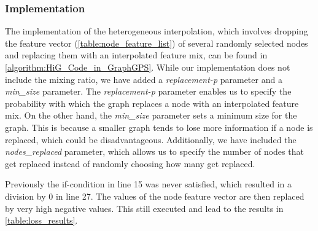 \subsubsection{Implementation}
The implementation of the heterogeneous interpolation, which involves dropping the feature vector (\autoref{table:node_feature_list}) of several randomly selected nodes and replacing them with an interpolated feature mix, can be found in \autoref{algorithm:HiG_Code_in_GraphGPS}. While our implementation does not include the mixing ratio, we have added a \emph{replacement-p} parameter and a \emph{min\_size} parameter. The \emph{replacement-p} parameter enables us to specify the probability with which the graph replaces a node with an interpolated feature mix. On the other hand, the \emph{min\_size} parameter sets a minimum size for the graph. This is because a smaller graph tends to lose more information if a node is replaced, which could be disadvantageous. Additionally, we have included the \emph{nodes\_replaced} parameter, which allows us to specify the number of nodes that get replaced instead of randomly choosing how many get replaced.

Previously the if-condition in line 15 was never satisfied, which resulted in a division by 0 in line 27. The values of the node feature vector are then replaced by very high negative values. This still executed and lead to the results in \autoref{table:loss_results}.

